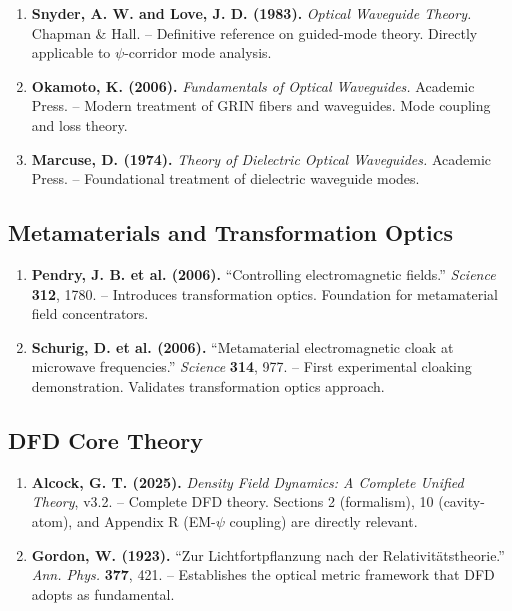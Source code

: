 \documentclass[11pt,a4paper]{article}
\begin{document}
\begin{enumerate}[resume]
\item \textbf{Snyder, A. W. and Love, J. D. (1983).}
\textit{Optical Waveguide Theory.} Chapman \& Hall.
-- Definitive reference on guided-mode theory. Directly applicable
to $\psi$-corridor mode analysis.

\item \textbf{Okamoto, K. (2006).}
\textit{Fundamentals of Optical Waveguides.} Academic Press.
-- Modern treatment of GRIN fibers and waveguides. Mode coupling
and loss theory.

\item \textbf{Marcuse, D. (1974).}
\textit{Theory of Dielectric Optical Waveguides.} Academic Press.
-- Foundational treatment of dielectric waveguide modes.
\end{enumerate}

\subsection{Metamaterials and Transformation Optics}

\begin{enumerate}[resume]
\item \textbf{Pendry, J. B. et al. (2006).} ``Controlling electromagnetic
fields.'' \textit{Science} \textbf{312}, 1780.
-- Introduces transformation optics. Foundation for metamaterial
field concentrators.

\item \textbf{Schurig, D. et al. (2006).} ``Metamaterial electromagnetic
cloak at microwave frequencies.'' \textit{Science} \textbf{314}, 977.
-- First experimental cloaking demonstration. Validates transformation
optics approach.
\end{enumerate}

\subsection{DFD Core Theory}

\begin{enumerate}[resume]
\item \textbf{Alcock, G. T. (2025).} \textit{Density Field Dynamics:
A Complete Unified Theory}, v3.2.
-- Complete DFD theory. Sections 2 (formalism), 10 (cavity-atom),
and Appendix R (EM-$\psi$ coupling) are directly relevant.

\item \textbf{Gordon, W. (1923).} ``Zur Lichtfortpflanzung nach der
Relativit\"{a}tstheorie.'' \textit{Ann. Phys.} \textbf{377}, 421.
-- Establishes the optical metric framework that DFD adopts as
fundamental.
\end{enumerate}
\end{document}
